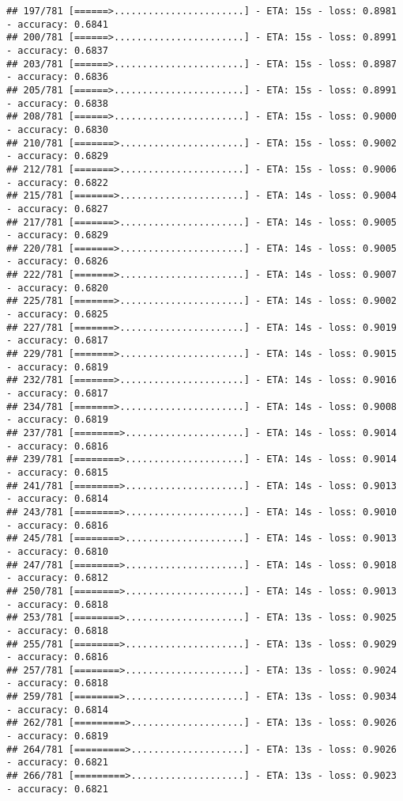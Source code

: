 \documentclass[
]{article}
\begin{document}
\begin{verbatim}
## 197/781 [======>.......................] - ETA: 15s - loss: 0.8981 - accuracy: 0.6841
## 200/781 [======>.......................] - ETA: 15s - loss: 0.8991 - accuracy: 0.6837
## 203/781 [======>.......................] - ETA: 15s - loss: 0.8987 - accuracy: 0.6836
## 205/781 [======>.......................] - ETA: 15s - loss: 0.8991 - accuracy: 0.6838
## 208/781 [======>.......................] - ETA: 15s - loss: 0.9000 - accuracy: 0.6830
## 210/781 [=======>......................] - ETA: 15s - loss: 0.9002 - accuracy: 0.6829
## 212/781 [=======>......................] - ETA: 15s - loss: 0.9006 - accuracy: 0.6822
## 215/781 [=======>......................] - ETA: 14s - loss: 0.9004 - accuracy: 0.6827
## 217/781 [=======>......................] - ETA: 14s - loss: 0.9005 - accuracy: 0.6829
## 220/781 [=======>......................] - ETA: 14s - loss: 0.9005 - accuracy: 0.6826
## 222/781 [=======>......................] - ETA: 14s - loss: 0.9007 - accuracy: 0.6820
## 225/781 [=======>......................] - ETA: 14s - loss: 0.9002 - accuracy: 0.6825
## 227/781 [=======>......................] - ETA: 14s - loss: 0.9019 - accuracy: 0.6817
## 229/781 [=======>......................] - ETA: 14s - loss: 0.9015 - accuracy: 0.6819
## 232/781 [=======>......................] - ETA: 14s - loss: 0.9016 - accuracy: 0.6817
## 234/781 [=======>......................] - ETA: 14s - loss: 0.9008 - accuracy: 0.6819
## 237/781 [========>.....................] - ETA: 14s - loss: 0.9014 - accuracy: 0.6816
## 239/781 [========>.....................] - ETA: 14s - loss: 0.9014 - accuracy: 0.6815
## 241/781 [========>.....................] - ETA: 14s - loss: 0.9013 - accuracy: 0.6814
## 243/781 [========>.....................] - ETA: 14s - loss: 0.9010 - accuracy: 0.6816
## 245/781 [========>.....................] - ETA: 14s - loss: 0.9013 - accuracy: 0.6810
## 247/781 [========>.....................] - ETA: 14s - loss: 0.9018 - accuracy: 0.6812
## 250/781 [========>.....................] - ETA: 14s - loss: 0.9013 - accuracy: 0.6818
## 253/781 [========>.....................] - ETA: 13s - loss: 0.9025 - accuracy: 0.6818
## 255/781 [========>.....................] - ETA: 13s - loss: 0.9029 - accuracy: 0.6816
## 257/781 [========>.....................] - ETA: 13s - loss: 0.9024 - accuracy: 0.6818
## 259/781 [========>.....................] - ETA: 13s - loss: 0.9034 - accuracy: 0.6814
## 262/781 [=========>....................] - ETA: 13s - loss: 0.9026 - accuracy: 0.6819
## 264/781 [=========>....................] - ETA: 13s - loss: 0.9026 - accuracy: 0.6821
## 266/781 [=========>....................] - ETA: 13s - loss: 0.9023 - accuracy: 0.6821

\end{verbatim}
\end{document}
